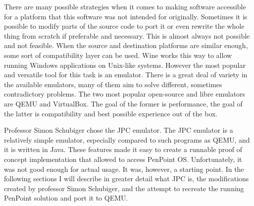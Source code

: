 There are many possible strategies when it comes to making software accessible
for a platform that this software was not intended for originally.  Sometimes
it is possible to modify parts of the source code to port it or even rewrite
the whole thing from scratch if preferable and necessary.  This is almost
always not possible and not feasible.  When the source and destination
platforms are similar enough, some sort of compatibility layer can be used.
Wine works this way to allow running Windows applications on Unix-like systems.
However the most popular and versatile tool for this task is an emulator.
There is a great deal of variety in the available emulators, many of them aim
to solve different, sometimes contradictory problems.  The two most popular
open-source and libre emulators are QEMU and VirtualBox.  The goal of the
former is performance, the goal of the latter is compatibility and best
possible experience out of the box.

Professor Simon Schubiger chose the JPC emulator.  The JPC emulator is
a relatively simple emulator, especially compared to such programs as QEMU, and
it is written in Java.  These features made it easy to create a runnable proof
of concept implementation that allowed to access PenPoint OS.  Unfortunately, it
was not good enough for actual usage.  It was, however, a starting point.  In
the following sections I will describe in greater detail what JPC is, the
modifications created by professor Simon Schubiger, and the attempt to recreate
the running PenPoint solution and port it to QEMU.
